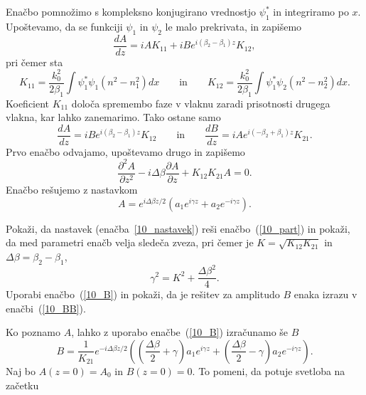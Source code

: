 Enačbo pomnožimo s kompleksno konjugirano vrednostjo $\psi_1^*$ in integriramo po $x$.
Upoštevamo, da se funkciji $\psi_1$ in $\psi_2$ le malo prekrivata, in zapišemo 
\begin{equation}
\frac{dA}{dz} = i A K_{11}+i B e^{i(\beta_2-\beta_1)z} K_{12},
\end{equation}
pri čemer sta
\begin{equation}
K_{11}= \frac{k_0^2}{2 \beta_1}\int\psi_1^*\psi_1 (n^2-n_1^2)dx \qquad \mathrm{in} \qquad 
K_{12}= \frac{k_0^2}{2 \beta_1}\int\psi_1^*\psi_2 (n^2-n_2^2)dx.
\end{equation}
Koeficient $K_{11}$ določa spremembo faze v vlaknu zaradi prisotnosti 
drugega vlakna, kar lahko zanemarimo. Tako ostane samo 
\begin{equation}
\frac{dA}{dz} = i B e^{i(\beta_2-\beta_1)z} K_{12} \qquad \mathrm{in}
\qquad \frac{dB}{dz} = i A e^{i(-\beta_2+\beta_1)z} K_{21}.
\label{10_B}
\end{equation}
Prvo enačbo odvajamo, upoštevamo drugo in zapišemo
\begin{equation}
\frac{\partial^2 A}{\partial z^2}-i \Delta \beta \frac{\partial A}{\partial z} + K_{12}K_{21}A = 0.
\label{10_part}
\end{equation}
Enačbo rešujemo z nastavkom 
\begin{equation}
A = e^{i \Delta \beta z/2}\left( a_1 e^{i \gamma z} + a_2 e^{-i \gamma z}\right).
\label{10_nastavek}
\end{equation}
\begin{definition}
 Pokaži, da  nastavek (enačba~\ref{10_nastavek}) reši enačbo~(\ref{10_part}) in pokaži,
 da med parametri enačb velja sledeča zveza, pri čemer je $K = \sqrt{K_{12}K_{21}}$ in 
 $\Delta \beta = \beta_2 - \beta_1$,
 \begin{equation}
 \gamma^2 = K^2 + \frac{\Delta \beta ^2}{4}.
 \label{10kgamma}
 \end{equation}
 Uporabi enačbo~(\ref{10_B}) in pokaži, da je rešitev za amplitudo $B$
 enaka izrazu v enačbi~(\ref{10_BB}).
\end{definition}
Ko poznamo $A$, lahko z uporabo enačbe~(\ref{10_B}) izračunamo še $B$
\begin{equation}
B = \frac{1}{K_{21}}
e^{-i \Delta \beta z/2}\left(\left(\frac{\Delta \beta}{2} +\gamma \right) a_1 e^{i \gamma z} + 
\left(\frac{\Delta \beta}{2} -\gamma \right)a_2 e^{-i \gamma z}\right).
\label{10_BB}
\end{equation}
Naj bo $A(z=0) = A_0$ in $B(z=0)=0$. To pomeni, da potuje svetloba na začetku

